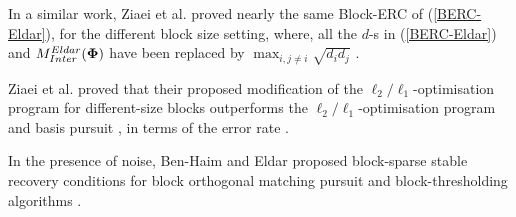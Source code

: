In a similar work, Ziaei et al. proved nearly the same Block-ERC of (\ref{BERC-Eldar}), for the different block size setting, where, all the $d$-s in (\ref{BERC-Eldar}) and $M^{Eldar}_{Inter}(\boldsymbol{\Phi})$ have been replaced by $\max_{i , j {\neq} i} \sqrt{d_i d_j}$ \cite{Ziaei2010}.

Ziaei et al. proved that their proposed modification of the $\ell_2/\ell_1$-optimisation program for different-size blocks outperforms the $\ell_2/\ell_1$-optimisation program \cite{Eldar2009c} and basis pursuit \cite{Chen2001}, in terms of the error rate \cite{Ziaei2010}.

In the presence of noise, Ben-Haim and Eldar proposed block-sparse stable recovery conditions for block orthogonal matching pursuit and block-thresholding algorithms \cite{Ben-Haim2011}.